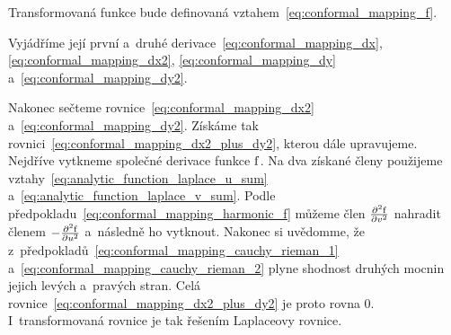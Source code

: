 Transformovaná funkce bude definovaná vztahem~\eqref{eq:conformal_mapping_f}.

Vyjádříme její první a~druhé derivace~\eqref{eq:conformal_mapping_dx}, \eqref{eq:conformal_mapping_dx2}, \eqref{eq:conformal_mapping_dy} a~\eqref{eq:conformal_mapping_dy2}.


Nakonec sečteme rovnice~\eqref{eq:conformal_mapping_dx2} a~\eqref{eq:conformal_mapping_dy2}. Získáme tak rovnici~\eqref{eq:conformal_mapping_dx2_plus_dy2}, kterou dále upravujeme. Nejdříve vytkneme společné derivace funkce \(\mathrm{f}\). Na dva získané členy použijeme vztahy~\eqref{eq:analytic_function_laplace_u_sum} a~\eqref{eq:analytic_function_laplace_v_sum}. Podle předpokladu~\eqref{eq:conformal_mapping_harmonic_f} můžeme člen \(\frac{\partial^2 \mathrm{f}}{\partial v^2}\) nahradit členem \(-\frac{\partial^2 \mathrm{f}}{\partial u^2}\) a~následně ho vytknout. Nakonec si uvědomme, že z~předpokladů~\eqref{eq:conformal_mapping_cauchy_rieman_1} a~\eqref{eq:conformal_mapping_cauchy_rieman_2} plyne shodnost druhých mocnin jejich levých a~pravých stran. Celá rovnice~\eqref{eq:conformal_mapping_dx2_plus_dy2} je proto rovna 0. I~transformovaná rovnice je tak řešením Laplaceovy rovnice.

